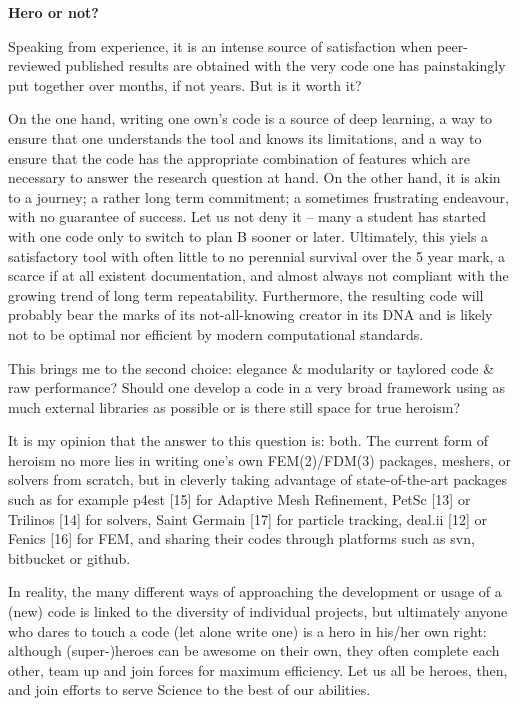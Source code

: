 \vspace{3mm}

{\bf Hero or not?}

\vspace{3mm}

Speaking from experience, it is an intense source of satisfaction when peer-reviewed published results are obtained with the very code one has painstakingly put together over months, if not years. But is it worth it?

On the one hand, writing one own’s code is a source of deep learning, a way to ensure that one understands the tool and knows its limitations, and a way to ensure that the code has the appropriate combination of features which are necessary to answer the research question at hand. On the other hand, it is akin to a journey; a rather long term commitment; a sometimes frustrating endeavour, with no guarantee of success. Let us not deny it – many a student has started with one code only to switch to plan B sooner or later. Ultimately, this yiels a satisfactory tool with often little to no perennial survival over the 5 year mark, a scarce if at all existent documentation, and almost always not compliant with the growing trend of long term repeatability. Furthermore, the resulting code will probably bear the marks of its not-all-knowing creator in its DNA and is likely not to be optimal nor efficient by modern computational standards.

This brings me to the second choice: elegance \& modularity or taylored code \& raw performance? Should one develop a code in a very broad framework using as much external libraries as possible or is there still space for true heroism?

It is my opinion that the answer to this question is: both. The current form of heroism no more lies in writing one’s own FEM(2)/FDM(3) packages, meshers, or solvers from scratch, but in cleverly taking advantage of state-of-the-art packages such as for example p4est [15] for Adaptive Mesh Refinement, PetSc [13] or Trilinos [14] for solvers, Saint Germain [17] for particle tracking, deal.ii [12] or Fenics [16] for FEM, and sharing their codes through platforms such as svn, bitbucket or github.

In reality, the many different ways of approaching the development or usage of a (new) code is linked to the diversity of individual projects, but ultimately anyone who dares to touch a code (let alone write one) is a hero in his/her own right: although (super-)heroes can be awesome on their own, they often complete each other, team up and join forces for maximum efficiency. Let us all be heroes, then, and join efforts to serve Science to the best of our abilities.

